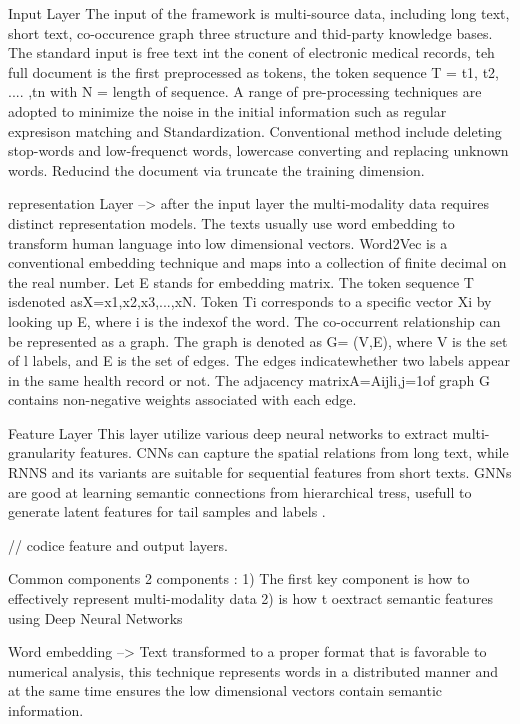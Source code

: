 Input Layer 
The input of the framework is multi-source data, including long text, short text, co-occurence graph three structure
and thid-party knowledge bases. 
The standard input is free text int the conent of electronic medical records, teh full document is the first
preprocessed as tokens, the token sequence T = {t1, t2, .... ,tn} with N = length of sequence. 
A range of pre-processing techniques are adopted to minimize the noise in the initial information 
such as regular expresison matching and Standardization. 
Conventional method include deleting stop-words and low-frequenct words, lowercase converting and replacing 
unknown words. Reducind the document via truncate the training dimension. 

representation Layer --> after the input layer the multi-modality data requires distinct representation models. 
The texts usually use word embedding to transform human language into low dimensional vectors. 
Word2Vec is a conventional embedding technique and maps into a collection of finite decimal on the real number. 
Let E stands for embedding matrix. The token sequence T isdenoted asX={x1,x2,x3,...,xN}. 
Token Ti corresponds to a specific vector Xi by looking up E, where i is the indexof the word.
The co-occurrent relationship can be represented as a graph. 
The graph is denoted as G= (V,E), where V is the set of l labels, and E is the set of edges.
The edges indicatewhether two labels appear in the same health record or not.
The adjacency matrix{A=Aij}li,j=1of graph G contains non-negative weights associated with each edge.

Feature Layer 
This layer utilize various deep neural networks to extract multi-granularity features. 
CNNs can capture the spatial relations from long text, while RNNS and its variants are suitable for sequential 
features from short texts. GNNs are good at learning semantic connections from hierarchical tress, usefull 
to generate latent features for tail samples and labels . 

// codice feature and output layers. 

Common components 
2 components : 
1) The first key component is how to effectively represent multi-modality data 
2) is how t oextract semantic features using Deep Neural Networks 

Word embedding --> Text transformed to a proper format that is favorable to numerical analysis, this technique
represents words in a distributed manner and at the same time ensures the low dimensional vectors contain semantic information. 

